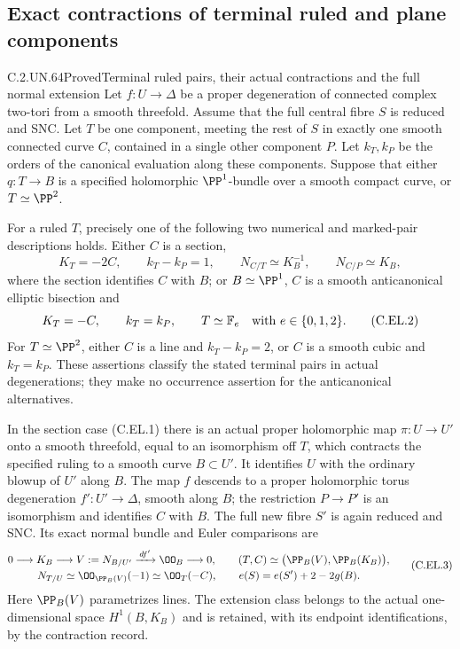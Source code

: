 \subsection{Exact contractions of terminal ruled and plane components}

\begin{statement}{C.2.UN.64}{Proved}{Terminal ruled pairs, their actual contractions and the full normal extension}
Let $f:U\to\Delta$ be a proper degeneration of connected complex
two-tori from a smooth threefold. Assume that the full central fibre
$S$ is reduced and SNC. Let $T$ be one component, meeting the rest
of $S$ in exactly one smooth connected curve $C$, contained in a
single other component $P$. Let $k_T,k_P$ be the orders of the
canonical evaluation along these components. Suppose that either
$q:T\to B$ is a specified holomorphic $\PP^1$-bundle over a smooth
compact curve, or $T\simeq\PP^2$.

For a ruled $T$, precisely one of the following two numerical and
marked-pair descriptions holds. Either $C$ is a section,
\[
 K_T=-2C,\qquad k_T-k_P=1,\qquad
 N_{C/T}\simeq K_B^{-1},\qquad N_{C/P}\simeq K_B,
                                                        \tag{C.EL.1}
\]
where the section identifies $C$ with $B$; or $B\simeq\PP^1$,
$C$ is a smooth anticanonical elliptic bisection and
\[
 K_T=-C,\qquad k_T=k_P,\qquad
 T\simeq\mathbb F_e\quad\hbox{with }e\in\{0,1,2\}.
                                                        \tag{C.EL.2}
\]
For $T\simeq\PP^2$, either $C$ is a line and $k_T-k_P=2$,
or $C$ is a smooth cubic and $k_T=k_P$.
These assertions classify the stated terminal pairs in actual
degenerations; they make no occurrence assertion for the
anticanonical alternatives.

In the section case (C.EL.1) there is an actual proper holomorphic
map $\pi:U\to U'$ onto a smooth threefold, equal to an isomorphism
off $T$, which contracts the specified ruling to a smooth curve
$B\subset U'$. It identifies $U$ with the ordinary blowup of $U'$
along $B$. The map $f$ descends to a proper holomorphic torus
degeneration $f':U'\to\Delta$, smooth along $B$; the restriction
$P\to P'$ is an isomorphism and identifies $C$ with $B$.
The full new fibre $S'$ is again reduced and SNC. Its exact normal
bundle and Euler comparisons are
\[
\begin{gathered}
 0\longrightarrow K_B\longrightarrow V:=N_{B/U'}
        \xrightarrow{\,df'\,}\OO_B\longrightarrow0,\qquad
 (T,C)\simeq\bigl(\PP_B(V),\PP_B(K_B)\bigr),\\
 N_{T/U}\simeq\OO_{\PP_B(V)}(-1)\simeq\OO_T(-C),\qquad
 e(S)=e(S')+2-2g(B).
\end{gathered}                                                   \tag{C.EL.3}
\]
Here $\PP_B(V)$ parametrizes lines. The extension class belongs
to the actual one-dimensional space $H^1(B,K_B)$ and is retained,
with its endpoint identifications, by the contraction record.


\end{statement}
